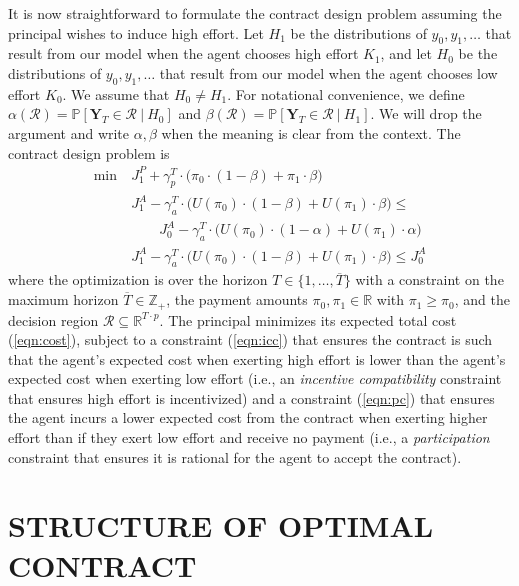 \documentclass[letterpaper, 10 pt, conference]{ieeeconf}  %
\begin{document}
It is now straightforward to formulate the contract design problem assuming the principal wishes to induce high effort. Let $H_1$ be the distributions of $y_0,y_1,\ldots$ that result from our model when the agent chooses high effort $K_1$, and let $H_0$ be the distributions of $y_0,y_1,\ldots$ that result from our model when the agent chooses low effort $K_0$. We assume that $H_0 \neq H_1$. For notational convenience, we define $\alpha(\mathcal{R}) = \mathbb{P}[\mathbf{Y}_T \in \mathcal{R}\ |\ H_0]$ and $\beta(\mathcal{R}) = \mathbb{P}[\mathbf{Y}_T \in \mathcal{R}\ |\ H_1]$. We will drop the argument and write $\alpha,\beta$ when the meaning is clear from the context. The contract design problem is 
\begin{align}
     \min\ & J_1^P + \gamma_p^T \cdot \big(\pi_0 \cdot (1-\beta) + \pi_1 \cdot \beta\big) \label{eqn:cost}\\
     & J_1^A - \gamma_a^T\cdot\big(U(\pi_0) \cdot (1-\beta) + U(\pi_1)\cdot\beta) \leq \nonumber \\
     & \qquad J_0^A - \gamma_a^T\cdot\big(U(\pi_0) \cdot (1-\alpha) + U(\pi_1)\cdot\alpha) \label{eqn:icc}\\
     & J_1^A - \gamma_a^T\cdot\big(U(\pi_0) \cdot (1-\beta) + U(\pi_1)\cdot\beta) \leq J_0^A \label{eqn:pc}
\end{align}
where the optimization is over the horizon $T \in \{1,\ldots,\overline{T}\}$ with a constraint on the maximum  horizon $\overline{T} \in \mathbb{Z}_+$, the payment amounts $\pi_0,\pi_1\in\mathbb{R}$ with $\pi_1 \geq \pi_0$, and the decision region $\mathcal{R} \subseteq \mathbb{R}^{T \cdot p}$. The principal minimizes its expected total cost (\ref{eqn:cost}), subject to a constraint (\ref{eqn:icc}) that ensures the contract is such that the agent's expected cost when exerting high effort is lower than the agent's expected cost when exerting low effort (i.e., an \emph{incentive compatibility} constraint that ensures high effort is incentivized) and a constraint (\ref{eqn:pc}) that ensures the agent incurs a lower expected cost from the contract when exerting higher effort than if they exert low effort and receive no payment (i.e., a \emph{participation} constraint that ensures it is rational for the agent to accept the contract). 

\section{STRUCTURE OF OPTIMAL CONTRACT}
\label{sec:soc}
\end{document}
